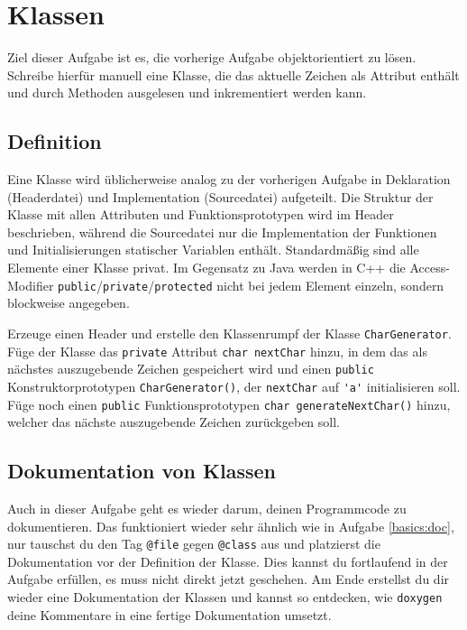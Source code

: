 \section{\ExercisePrefixBasics Klassen}
Ziel dieser Aufgabe ist es, die vorherige Aufgabe objektorientiert zu lösen. Schreibe hierfür manuell eine Klasse, die das aktuelle Zeichen als Attribut enthält und durch Methoden ausgelesen und inkrementiert werden kann.


\subsection{Definition}
Eine Klasse wird üblicherweise analog zu der vorherigen Aufgabe in Deklaration (Headerdatei) und Implementation (Sourcedatei) aufgeteilt.
Die Struktur der Klasse mit allen Attributen und Funktionsprototypen wird im Header beschrieben, während die Sourcedatei nur die Implementation der Funktionen und Initialisierungen statischer Variablen enthält.
Standardmäßig sind alle Elemente einer Klasse privat.
Im Gegensatz zu Java werden in C++ die Access-Modifier \lstinline{public}/\lstinline{private}/\lstinline{protected} nicht bei jedem Element einzeln, sondern blockweise angegeben.


Erzeuge einen Header  und erstelle den Klassenrumpf der Klasse \lstinline{CharGenerator}.
Füge der Klasse das \lstinline{private} Attribut \lstinline{char nextChar} hinzu, in dem das als nächstes auszugebende Zeichen gespeichert wird und einen \lstinline{public} Konstruktorprototypen \lstinline{CharGenerator()}, der \lstinline{nextChar} auf \lstinline{'a'} initialisieren soll.
Füge noch einen \lstinline{public} Funktionsprototypen \lstinline{char generateNextChar()} hinzu, welcher das nächste auszugebende Zeichen zurückgeben soll.



\subsection{Dokumentation von Klassen}
Auch in dieser Aufgabe geht es wieder darum, deinen Programmcode zu dokumentieren.
Das funktioniert wieder sehr ähnlich wie in Aufgabe \ref{basics:doc}, nur tauschst du den Tag \lstinline{@file} gegen \lstinline{@class} aus und platzierst die Dokumentation vor der Definition der Klasse.
Dies kannst du fortlaufend in der Aufgabe erfüllen, es muss nicht direkt jetzt geschehen.
Am Ende erstellst du dir wieder eine Dokumentation der Klassen und kannst so entdecken, wie \texttt{doxygen} deine Kommentare in eine fertige Dokumentation umsetzt.

